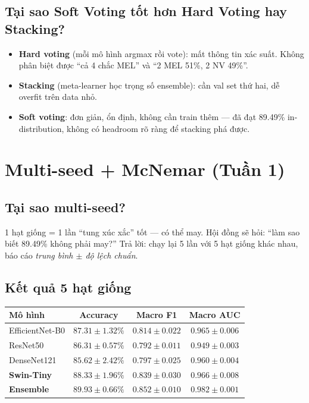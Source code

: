 \documentclass[11pt,a4paper]{article}
\begin{document}
\subsection{Tại sao Soft Voting tốt hơn Hard Voting hay Stacking?}

\begin{itemize}[leftmargin=*]
  \item \textbf{Hard voting} (mỗi mô hình argmax rồi vote): mất thông tin xác suất. Không phân biệt được ``cả 4 chắc MEL'' và ``2 MEL 51\%, 2 NV 49\%''.
  \item \textbf{Stacking} (meta-learner học trọng số ensemble): cần val set thứ hai, dễ overfit trên data nhỏ.
  \item \textbf{Soft voting}: đơn giản, ổn định, không cần train thêm --- đã đạt 89.49\% in-distribution, không có headroom rõ ràng để stacking phá được.
\end{itemize}

\section{Multi-seed + McNemar (Tuần 1)}

\subsection{Tại sao multi-seed?}

\begin{simple}
1 hạt giống = 1 lần ``tung xúc xắc'' tốt --- có thể may. Hội đồng sẽ hỏi: ``làm sao biết 89.49\% không phải may?'' Trả lời: chạy lại 5 lần với 5 hạt giống khác nhau, báo cáo \textit{trung bình $\pm$ độ lệch chuẩn}.
\end{simple}

\subsection{Kết quả 5 hạt giống}

\begin{table}[h]
\centering\small
\begin{tabular}{lccc}
\toprule
\textbf{Mô hình} & \textbf{Accuracy} & \textbf{Macro F1} & \textbf{Macro AUC} \\
\midrule
EfficientNet-B0  & $87.31 \pm 1.32\%$ & $0.814 \pm 0.022$ & $0.965 \pm 0.006$ \\
ResNet50         & $86.31 \pm 0.57\%$ & $0.792 \pm 0.011$ & $0.949 \pm 0.003$ \\
DenseNet121      & $85.62 \pm 2.42\%$ & $0.797 \pm 0.025$ & $0.960 \pm 0.004$ \\
\textbf{Swin-Tiny} & $\mathbf{88.33 \pm 1.96\%}$ & $\mathbf{0.839 \pm 0.030}$ & $0.966 \pm 0.008$ \\
\midrule
\rowcolor{usthblue!10}\textbf{Ensemble} & $\mathbf{89.93 \pm 0.66\%}$ & $\mathbf{0.852 \pm 0.010}$ & $\mathbf{0.982 \pm 0.001}$ \\
\bottomrule
\end{tabular}
\end{table}
\end{document}
